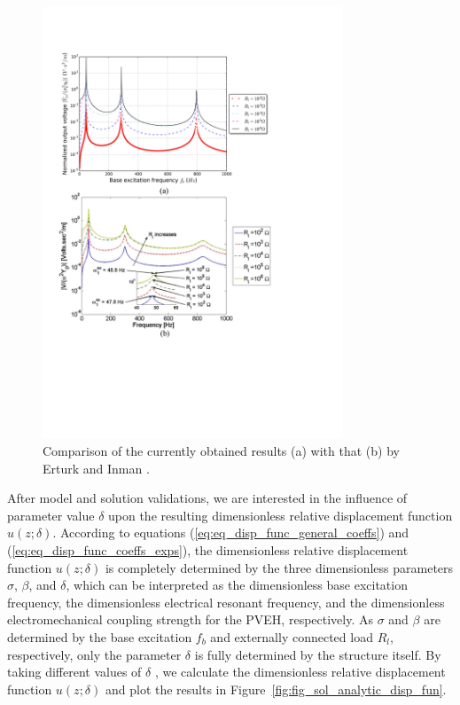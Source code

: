 \documentclass{svjour3}                     %
\begin{document}
\begin{figure}[!htbp]
    \centering
    \includegraphics[width=0.8\textwidth]{./img_eig_asy/fig_sol_analytic_perf_vs_fr_mod}
    \caption{Comparison of the currently obtained results (a) with that (b) by Erturk and Inman \cite{erturk2008distributed}.}
    \label{fig:fig_sol_analytic_perf_vs_fr_mod}
\end{figure}


After model and solution validations, we are interested in the influence of parameter value $\delta$ upon the resulting dimensionless relative displacement function $u(z;\delta)$. According to equations (\ref{eq:eq_disp_func_general_coeffs}) and (\ref{eq:eq_disp_func_coeffs_exps}), the dimensionless relative displacement function $u(z;\delta)$ is completely determined by the three dimensionless parameters $\sigma$, $\beta$, and $\delta$, which can be interpreted as the dimensionless base excitation frequency, the dimensionless electrical resonant frequency, and the dimensionless electromechanical coupling strength for the PVEH, respectively. As $\sigma$ and $\beta$ are determined by the base excitation $f_b$ and externally connected load $R_l$, respectively, only the parameter $\delta$ is fully determined by the structure itself. By taking different values of $\delta$ , we calculate the dimensionless relative displacement function $u(z;\delta)$ and plot the results in Figure~\ref{fig:fig_sol_analytic_disp_fun}.
\end{document}
